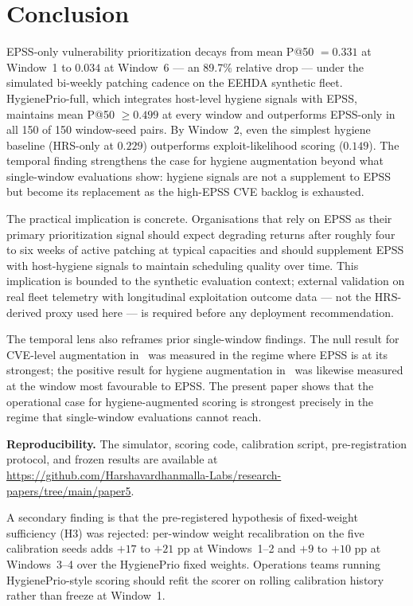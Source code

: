 \section{Conclusion}
\label{sec:conclusion}

EPSS-only vulnerability prioritization decays from mean P@50 $= 0.331$ at Window~1 to $0.034$ at Window~6 --- an 89.7\% relative drop --- under the simulated bi-weekly patching cadence on the EEHDA synthetic fleet. HygienePrio-full, which integrates host-level hygiene signals with EPSS, maintains mean P@50 $\geq 0.499$ at every window and outperforms EPSS-only in all 150 of 150 window-seed pairs. By Window~2, even the simplest hygiene baseline (HRS-only at $0.229$) outperforms exploit-likelihood scoring ($0.149$). The temporal finding strengthens the case for hygiene augmentation beyond what single-window evaluations show: hygiene signals are not a supplement to EPSS but become its replacement as the high-EPSS CVE backlog is exhausted.

The practical implication is concrete. Organisations that rely on EPSS as their primary prioritization signal should expect degrading returns after roughly four to six weeks of active patching at typical capacities and should supplement EPSS with host-hygiene signals to maintain scheduling quality over time. This implication is bounded to the synthetic evaluation context; external validation on real fleet telemetry with longitudinal exploitation outcome data --- not the HRS-derived proxy used here --- is required before any deployment recommendation.

The temporal lens also reframes prior single-window findings. The null result for CVE-level augmentation in~\cite{paper1vulnprio} was measured in the regime where EPSS is at its strongest; the positive result for hygiene augmentation in~\cite{paper4hygieneprio} was likewise measured at the window most favourable to EPSS. The present paper shows that the operational case for hygiene-augmented scoring is strongest precisely in the regime that single-window evaluations cannot reach.

\textbf{Reproducibility.} The simulator, scoring code, calibration script, pre-registration protocol, and frozen results are available at \url{https://github.com/Harshavardhanmalla-Labs/research-papers/tree/main/paper5}.

A secondary finding is that the pre-registered hypothesis of fixed-weight sufficiency (H3) was rejected: per-window weight recalibration on the five calibration seeds adds $+17$ to $+21$ pp at Windows~1--2 and $+9$ to $+10$ pp at Windows~3--4 over the HygienePrio fixed weights. Operations teams running HygienePrio-style scoring should refit the scorer on rolling calibration history rather than freeze at Window~1.

